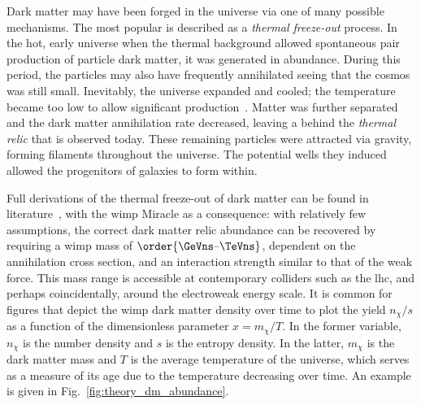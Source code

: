 Dark matter may have been forged in the universe via one of many possible mechanisms. The most popular is described as a \emph{thermal freeze-out} process. In the hot, early universe when the thermal background allowed spontaneous pair production of particle dark matter, it was generated in abundance. During this period, the particles may also have frequently annihilated seeing that the cosmos was still small. Inevitably, the universe expanded and cooled; the temperature became too low to allow significant production~\cite{Baldes:2017gzw}. Matter was further separated and the dark matter annihilation rate decreased, leaving a behind the \emph{thermal relic} that is observed today. These remaining particles were attracted via gravity, forming filaments throughout the universe. The potential wells they induced allowed the progenitors of galaxies to form within.

Full derivations of the thermal freeze-out of dark matter can be found in literature~\cite{cosmic_abundances_stable_particles,Bender:2012gc}, with the \acrshort{wimp} Miracle as a consequence: with relatively few assumptions, the correct dark matter relic abundance can be recovered by requiring a \acrshort{wimp} mass of $\order{\text{\GeVns--\TeVns}}$, dependent on the annihilation cross section, and an interaction strength similar to that of the weak force. This mass range is accessible at contemporary colliders such as the \acrshort{lhc}, and perhaps coincidentally, around the electroweak energy scale. It is common for figures that depict the \acrshort{wimp} dark matter density over time to plot the yield $n_{\chi}/s$ as a function of the dimensionless parameter $x = m_{\chi}/T$. In the former variable, $n_{\chi}$ is the number density and $s$ is the entropy density. In the latter, $m_{\chi}$ is the dark matter mass and $T$ is the average temperature of the universe, which serves as a measure of its age due to the temperature decreasing over time. An example is given in Fig.~\ref{fig:theory_dm_abundance}.

